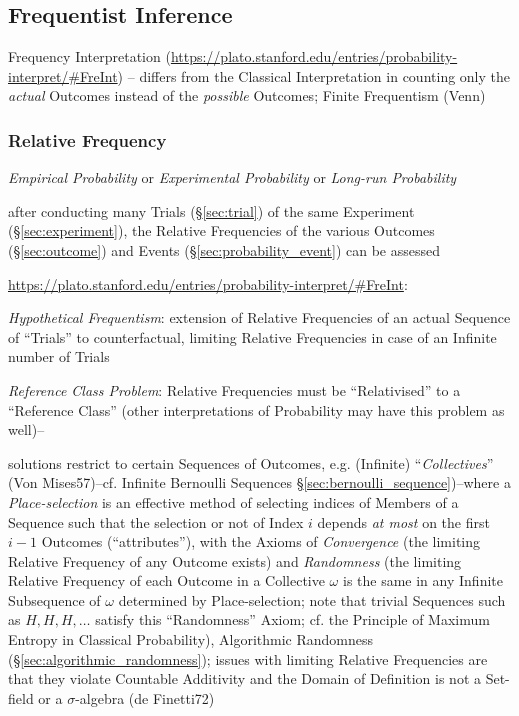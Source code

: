 \subsection{Frequentist Inference}\label{sec:frequentist_inference}

Frequency Interpretation
(\url{https://plato.stanford.edu/entries/probability-interpret/#FreInt}) --
differs from the Classical Interpretation in counting only the \emph{actual}
Outcomes instead of the \emph{possible} Outcomes; Finite Frequentism (Venn)



\subsubsection{Relative Frequency}\label{sec:relative_frequency}

\emph{Empirical Probability} or \emph{Experimental Probability} or
\emph{Long-run Probability}

after conducting many Trials (\S\ref{sec:trial}) of the same Experiment
(\S\ref{sec:experiment}), the Relative Frequencies of the various Outcomes
(\S\ref{sec:outcome}) and Events (\S\ref{sec:probability_event}) can be assessed

\url{https://plato.stanford.edu/entries/probability-interpret/#FreInt}:

\emph{Hypothetical Frequentism}: extension of Relative Frequencies of an actual
Sequence of ``Trials'' to counterfactual, limiting Relative Frequencies in case
of an Infinite number of Trials

\emph{Reference Class Problem}: Relative Frequencies must be ``Relativised'' to
a ``Reference Class'' (other interpretations of Probability may have this
problem as well)--

solutions restrict to certain Sequences of Outcomes, e.g. (Infinite)
``\emph{Collectives}'' (Von Mises57)--cf. Infinite Bernoulli Sequences
\S\ref{sec:bernoulli_sequence})--where a \emph{Place-selection} is an effective
method of selecting indices of Members of a Sequence such that the selection or
not of Index $i$ depends \emph{at most} on the first $i-1$ Outcomes
(``attributes''), with the Axioms of \emph{Convergence} (the limiting Relative
Frequency of any Outcome exists) and \emph{Randomness} (the limiting Relative
Frequency of each Outcome in a Collective $\omega$ is the same in any Infinite
Subsequence of $\omega$ determined by Place-selection; note that trivial
Sequences such as $H,H,H,\ldots$ satisfy this ``Randomness'' Axiom; cf. the
Principle of Maximum Entropy in Classical Probability), Algorithmic Randomness
(\S\ref{sec:algorithmic_randomness});
issues with limiting Relative Frequencies are that they violate Countable
Additivity and the Domain of Definition is not a Set-field or a $\sigma$-algebra
(de Finetti72)



